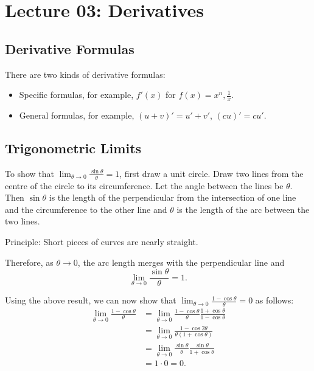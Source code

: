 \section{Lecture 03: Derivatives}


\subsection{Derivative Formulas}

There are two kinds of derivative formulas:
\begin{itemize}
\item
    Specific formulas, for example, \( f'(x) \) for \( f(x) = x^n,
    \frac{1}{x} \).
\item
    General formulas, for example, \( (u + v)' = u' + v' \), \( (cu)' =
    cu' \).
\end{itemize}


\subsection{Trigonometric Limits}
To show that \( \lim_{\theta \to 0} \frac{\sin \theta}{\theta} = 1 \),
first draw a unit circle. Draw two lines from the centre of the circle
to its circumference. Let the angle between the lines be \( \theta \).
Then \( \sin \theta \) is the length of the perpendicular from the
intersection of one line and the circumference to the other line and \(
\theta \) is the length of the arc between the two lines.

Principle: Short pieces of curves are nearly straight.

Therefore, as \( \theta \to 0 \), the arc length merges with the
perpendicular line and
\[
    \lim_{\theta \to 0} \frac{\sin \theta}{\theta} = 1.
\]

Using the above result, we can now show that \( \lim_{\theta \to 0}
\frac{1 - \cos \theta}{\theta} = 0 \) as follows:
\begin{align*}
    \lim_{\theta \to 0} \frac{1 - \cos \theta}{\theta}
        & = \lim_{\theta \to 0}
            \frac{1 - \cos \theta}{\theta}
            \frac{1 + \cos \theta}{1 - \cos \theta} \\
        & = \lim_{\theta \to 0}
            \frac{1 - \cos2 \theta}{\theta(1 + \cos \theta)} \\
        & = \lim_{\theta \to 0}
            \frac{\sin \theta}{\theta}
            \frac{\sin \theta}{1 + \cos \theta} \\
        & = 1 \cdot 0 = 0.
\end{align*}


